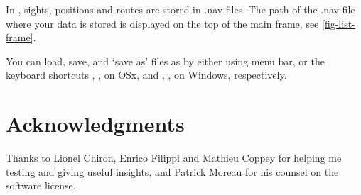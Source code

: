 \documentclass{ol-softwaremanual}
\makeatletter
\def\setmenukeyswin{\def\tw@mk@os{win}}
\def\setmenukeysmac{\def\tw@mk@os{mac}}
\makeatother
\begin{document}
In \thel, \glspl{sight}, \glspl{position} and \glspl{route} are stored in .nav files. The path of the .nav file where your data is stored is displayed on the top of the main frame, see \cref{fig-list-frame}. 








You can load, save, and `save as' files as by either using \thel menu bar, or the keyboard shortcuts 
\setmenukeysmac
{}, ,  on OSx, and  
\setmenukeyswin
{}, ,  on Windows, respectively.  


\pagebreak

\section*{Acknowledgments}

Thanks to Lionel Chiron, Enrico Filippi and Mathieu Coppey for helping me testing \thel and giving useful insights, and Patrick Moreau for his counsel on the software license. 

\printacronyms[pages={display=all,seq/use=false}]

\printnoidxglossary



\end{document}
